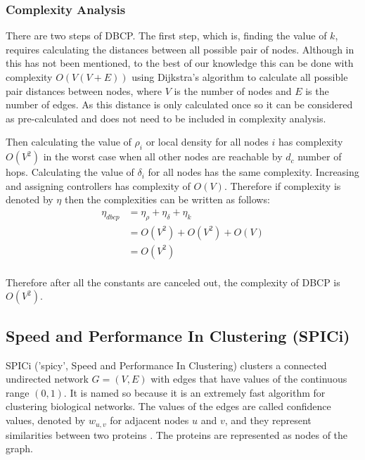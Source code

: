 \documentclass[a4paper,twocolumn,preprint]{elsarticle}
\begin{document}
\subsubsection{Complexity Analysis} \label{dbcp:compan}
There are two steps of DBCP. The first step, which is, finding the value of $k$, requires calculating the distances between all possible pair of nodes. Although in \cite{dbcp2017} this has not been mentioned, to the best of our knowledge this can be done with complexity $O(V(V+E))$ using Dijkstra's algorithm to calculate all possible pair distances between nodes, where $V$ is the number of nodes and $E$ is the number of edges. As this distance is only calculated once so it can be considered as pre-calculated and does not need to be included in complexity analysis.

Then calculating the value of $\rho_i$ or local density for all nodes $i$ has complexity $O(V^2)$ in the worst case when all other nodes are reachable by $d_c$ number of hops. Calculating the value of $\delta_i$ for all nodes has the same complexity. Increasing and assigning controllers has complexity of $O(V)$. Therefore if complexity is denoted by $\eta$ then the complexities can be written as follows:
\begin{equation}
\begin{split}
\eta_{dbcp} 
& = \eta_{\rho} + \eta_{\delta} + \eta_{k}\\
& =O(V^2) + O(V^2) + O(V)\\
& =O(V^2) \\
\end{split}
\end{equation}

Therefore after all the constants are canceled out, the complexity of DBCP is $O(V^2)$.

\subsection{Speed and Performance In Clustering (SPICi)\cite{spici2010}}
SPICi ('spicy', Speed and Performance In Clustering) clusters a connected undirected network $G=(V,E)$ with edges that have values of the continuous range $(0,1)$. It is named so because it is an extremely fast algorithm for clustering biological networks. The values of the edges are called confidence values, denoted by $w_{u,v}$ for adjacent nodes $u$ and $v$, and they represent similarities between two proteins \cite{protein2005palla}. The proteins are represented as nodes of the graph.
\end{document}
